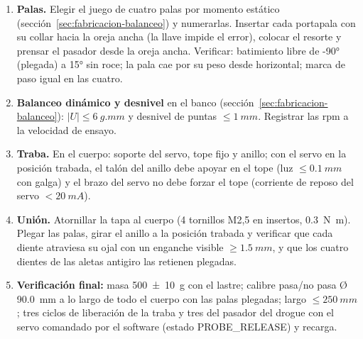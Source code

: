 \begin{enumerate}[leftmargin=*, label=\textbf{\arabic*.}]
        el pasador la sostiene y el servo lo retira.
  \item \textbf{Palas.} Elegir el juego de cuatro palas por momento estático
        (sección~\ref{sec:fabricacion-balanceo}) y numerarlas. Insertar cada portapala con
        su collar hacia la oreja ancha (la llave impide el error), colocar el resorte y
        prensar el pasador desde la oreja ancha. Verificar: batimiento libre de
        \ang{-90} (plegada) a \ang{+15} sin roce; la pala cae por su peso desde
        horizontal; marca de paso igual en las cuatro.
  \item \textbf{Balanceo dinámico y desnivel} en el banco
        (sección~\ref{sec:fabricacion-balanceo}): $|U|\le\SI{6}{g.mm}$ y desnivel de
        puntas $\le\SI{1}{mm}$. Registrar las rpm a la velocidad de ensayo.
  \item \textbf{Traba.} En el cuerpo: soporte del servo, tope fijo y anillo; con el servo
        en la posición trabada, el talón del anillo debe apoyar en el tope (luz
        $\le\SI{0.1}{mm}$ con galga) y el brazo del servo no debe forzar el tope (corriente
        de reposo del servo $<\SI{20}{mA}$).
  \item \textbf{Unión.} Atornillar la tapa al cuerpo (4 tornillos M2,5 en insertos,
        \SI{0.3}{N.m}). Plegar las palas, girar el anillo a la posición trabada y
        verificar que cada diente atraviesa su ojal con un enganche visible
        $\ge\SI{1.5}{mm}$, y que los cuatro dientes de las aletas antigiro las retienen plegadas.
  \item \textbf{Verificación final:} masa \SI{500 \pm 10}{g} con el lastre; calibre
        pasa/no pasa Ø\,\SI{90.0}{mm} a lo largo de todo el cuerpo con las palas
        plegadas; largo $\le\SI{250}{mm}$; tres ciclos de liberación de la traba y tres del pasador del
        drogue con el servo comandado por el software (estado PROBE\_RELEASE) y recarga.
\end{enumerate}

